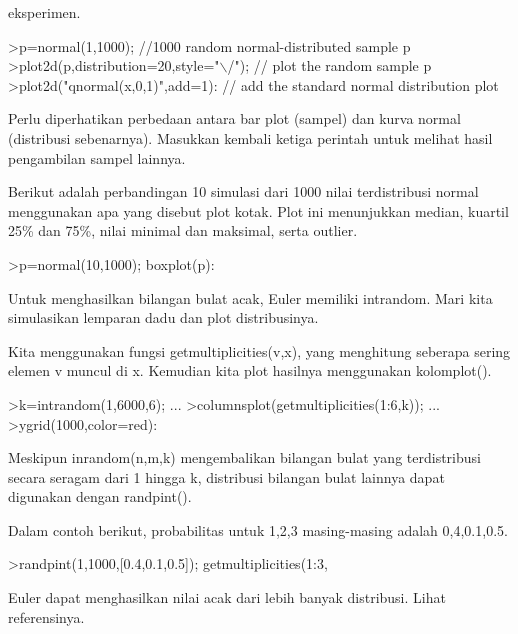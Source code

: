 \documentclass[a4paper,10pt]{article}
\begin{document}
\begin{eulernotebook}
\begin{eulercomment}
\begin{eulercomment}
\begin{eulercomment}
eksperimen.
\end{eulercomment}
\begin{eulerprompt}
>p=normal(1,1000); //1000 random normal-distributed sample p
>plot2d(p,distribution=20,style="\(\backslash\)/"); // plot the random sample p
>plot2d("qnormal(x,0,1)",add=1): // add the standard normal distribution plot
\end{eulerprompt}
\begin{eulercomment}
Perlu diperhatikan perbedaan antara bar plot (sampel) dan kurva normal
(distribusi sebenarnya). Masukkan kembali ketiga perintah untuk
melihat hasil pengambilan sampel lainnya.
\end{eulercomment}
\begin{eulercomment}
Berikut adalah perbandingan 10 simulasi dari 1000 nilai terdistribusi
normal menggunakan apa yang disebut plot kotak. Plot ini menunjukkan
median, kuartil 25\% dan 75\%, nilai minimal dan maksimal, serta
outlier.
\end{eulercomment}
\begin{eulerprompt}
>p=normal(10,1000); boxplot(p):
\end{eulerprompt}
\begin{eulercomment}
Untuk menghasilkan bilangan bulat acak, Euler memiliki intrandom. Mari
kita simulasikan lemparan dadu dan plot distribusinya.

Kita menggunakan fungsi getmultiplicities(v,x), yang menghitung
seberapa sering elemen v muncul di x. Kemudian kita plot hasilnya
menggunakan kolomplot().
\end{eulercomment}
\begin{eulerprompt}
>k=intrandom(1,6000,6);  ...
>columnsplot(getmultiplicities(1:6,k));  ...
>ygrid(1000,color=red):
\end{eulerprompt}
\begin{eulercomment}
Meskipun inrandom(n,m,k) mengembalikan bilangan bulat yang
terdistribusi secara seragam dari 1 hingga k, distribusi bilangan
bulat lainnya dapat digunakan dengan randpint().

Dalam contoh berikut, probabilitas untuk 1,2,3 masing-masing adalah
0,4,0.1,0.5.
\end{eulercomment}
\begin{eulerprompt}
>randpint(1,1000,[0.4,0.1,0.5]); getmultiplicities(1:3,%
\end{eulerprompt}
\begin{euleroutput}
  [378,  102,  520]
\end{euleroutput}
\begin{eulercomment}
Euler dapat menghasilkan nilai acak dari lebih banyak distribusi.
Lihat referensinya.


\end{eulercomment}
\end{eulercomment}
\end{eulercomment}
\end{eulernotebook}
\end{document}
